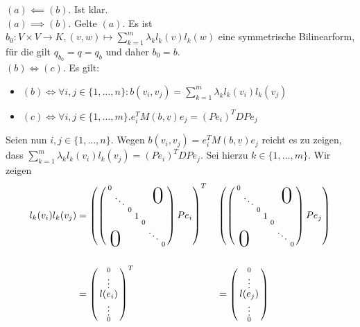 \documentclass[../../main.tex]{subfiles}
\begin{document}
\begin{cproof}
$(a)\impliedby (b)$. Ist klar.\\

\noindent $(a)\implies (b)$. Gelte $(a)$. Es ist $b_0: V\times V\to K, (v,w)\mapsto \sum_{k=1}^m\lambda_k l_k(v)l_k(w)$ eine symmetrische Bilinearform, für die gilt $q_{b_0}=q=q_b$ und daher $b_0=b$.\\	

\noindent$(b)\Longleftrightarrow (c)$. Es gilt:
\begin{itemize}
\item $(b)\Longleftrightarrow \forall i,j\in\{1,\ldots ,n\}: b(v_i,v_j)=\sum_{k=1}^m\lambda_k l_k(v_i)l_k(v_j)$
\item $(c)\Longleftrightarrow \forall i,j\in\{1,\ldots ,m\}. e_i^TM(b,\underline{v})e_j=	(Pe_i)^TDPe_j$
\end{itemize}
Seien nun $i,j\in\{1,\ldots ,n\}$. Wegen $b(v_i,v_j)=e_i^TM(b,\underline{v})e_j$ reicht es zu zeigen, dass $\sum_{k=1}^m\lambda_k l_k(v_i)l_k(v_j)=(Pe_i)^TDPe_j$. Sei hierzu $k\in\{1,\ldots ,m\}$. Wir zeigen
\begin{align*}
l_k(v_i)l_k(v_j)&=\left(\left(\begin{smallmatrix}
0 & & & & & &\llap{$\overset{\blap{\Huge 0}}{~}$}\\
& \ddots & & & &\\ 
& & 0 & & & &\\
& & & \tikz[remember picture]\node[inner sep=0pt] (a) {\small 1}; & & &\\& & &  & 0 & &\\& & & & &\ddots &\\
\rlap{\tlap{\Huge 0}} & & & & & &0\end{smallmatrix}\right)Pe_i\right)^T& &\left(\left(\begin{smallmatrix}
0 & & & & & &\llap{$\overset{\blap{\Huge 0}}{~}$}\\
& \ddots & & & &\\ 
& & 0 & & & &\\
& & & \tikz[remember picture]\node[inner sep=0pt] (c) {\small 1}; & & &\\& & &  & 0 & &\\& & & & &\ddots &\\
\rlap{\tlap{\Huge 0}} & & & & & &0\end{smallmatrix}\right)Pe_j\right)\\
&\, & &\\
&=\cvec{0\\ \vdots\\\tikz[remember picture]\node[inner sep=0pt] (g) {$l(e_i)$};\\\vdots\\0}^T& &=\cvec{0\\ \vdots\\\tikz[remember picture]\node[inner sep=0pt] (e) {$l(e_j)$};\\\vdots\\0}

\end{align*}
\end{cproof}
\end{document}
